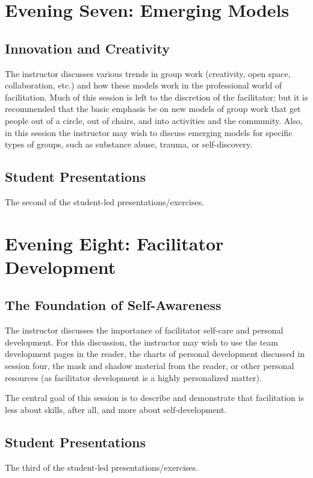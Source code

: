 \documentclass[12pt,DIV7,oneside,tocindent,headsepline]{scrbook}
\begin{document}
\section{Evening Seven: Emerging Models}  

\subsection{Innovation and Creativity}

The instructor discusses various trends in group work (creativity, open space, collaboration, etc.) and how these models work in the professional world of facilitation. Much of this session is left to the discretion of the facilitator; but it is recommended that the basic emphasis be on new models of group work that get people out of a circle, out of chairs, and into activities and the community.  Also, in this session the instructor may wish to discuss emerging models for specific types of groups, such as substance abuse, trauma, or self-discovery.  

\subsection{Student Presentations}  
The second of the student-led presentations/exercises.

\section{Evening Eight: Facilitator Development}  

\subsection{The Foundation of Self-Awareness}


The instructor discusses the importance of facilitator self-care and personal development. For this discussion, the instructor may wish to use the team development pages in the reader, the charts of personal development discussed in session four, the mask and shadow material from the reader, or other personal resources (as facilitator development is a highly personalized matter).

The central goal of this session is to describe and demonstrate that facilitation is less about skills, after all, and more about self-development.

\subsection{Student Presentations}  
The third of the student-led presentations/exercises.  
\end{document}
